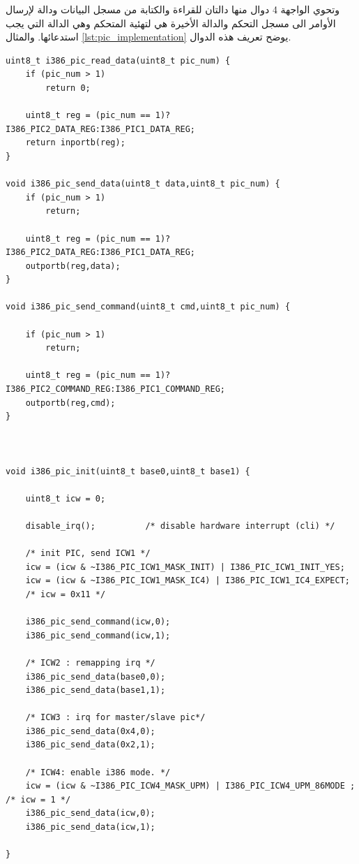 \documentclass[document.tex]{subfiles}
\begin{document}
وتحوي الواجهة 4 دوال منها دالتان للقراءة والكتابة من مسجل البيانات ودالة لإرسال الأوامر الى مسجل التحكم والدالة الأخيرة هي لتهئية المتحكم وهي الدالة التي يجب استدعائها. والمثال \ref{lst:pic_implementation} يوضح تعريف هذه الدوال.
\begin{english}

\lstset{numberstyle=\tiny,numbers=left,stepnumber=1,numbersep=5pt,tabsize=2,extendedchars=true,breaklines=true,frame=b,showspaces=false, showtabs=false,xleftmargin=10pt,framexleftmargin=10pt,framexrightmargin=5pt,framexbottommargin=4pt,showstringspaces=false,language=C++}


\begin{lstlisting}[label=lst:pic_implementation,caption=\en{hal/pic.cpp: PIC Implementation}]
uint8_t i386_pic_read_data(uint8_t pic_num) {
	if (pic_num > 1)
		return 0;
	
	uint8_t reg = (pic_num == 1)?I386_PIC2_DATA_REG:I386_PIC1_DATA_REG;
	return inportb(reg);
}

void i386_pic_send_data(uint8_t data,uint8_t pic_num) {
	if (pic_num > 1)
		return;
		
	uint8_t reg = (pic_num == 1)?I386_PIC2_DATA_REG:I386_PIC1_DATA_REG;
	outportb(reg,data);
}

void i386_pic_send_command(uint8_t cmd,uint8_t pic_num) {
	
	if (pic_num > 1)
		return;
		
	uint8_t reg = (pic_num == 1)?I386_PIC2_COMMAND_REG:I386_PIC1_COMMAND_REG;
	outportb(reg,cmd);
}



void i386_pic_init(uint8_t base0,uint8_t base1) {
	
	uint8_t icw = 0;
	
	disable_irq();			/* disable hardware interrupt (cli) */
	
	/* init PIC, send ICW1 */
	icw = (icw & ~I386_PIC_ICW1_MASK_INIT) | I386_PIC_ICW1_INIT_YES;
	icw = (icw & ~I386_PIC_ICW1_MASK_IC4) | I386_PIC_ICW1_IC4_EXPECT;
	/* icw = 0x11 */
	
	i386_pic_send_command(icw,0);
	i386_pic_send_command(icw,1);
	
	/* ICW2 : remapping irq */
	i386_pic_send_data(base0,0);
	i386_pic_send_data(base1,1);
	
	/* ICW3 : irq for master/slave pic*/
	i386_pic_send_data(0x4,0);
	i386_pic_send_data(0x2,1);
	
	/* ICW4: enable i386 mode. */
	icw = (icw & ~I386_PIC_ICW4_MASK_UPM) | I386_PIC_ICW4_UPM_86MODE ; /* icw = 1 */
	i386_pic_send_data(icw,0);
	i386_pic_send_data(icw,1);
	
}
\end{lstlisting}
\end{english}
\end{document}
